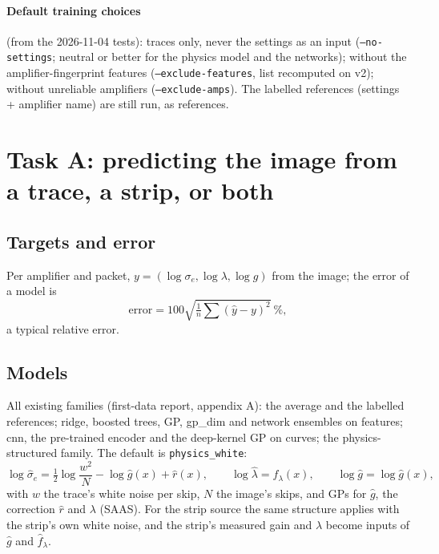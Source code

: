 \documentclass[11pt]{article}
\begin{document}
\paragraph{Default training choices} (from the 2026-11-04 tests): traces only, never the settings as an input
(\texttt{--no-settings}; neutral or better for the physics model and the networks); without the amplifier-fingerprint
features (\texttt{--exclude-features}, list recomputed on v2); without unreliable amplifiers
(\texttt{--exclude-amps}). The labelled references (settings + amplifier name) are still run, as references.

\section{Task A: predicting the image from a trace, a strip, or both}

\subsection{Targets and error}
Per amplifier and packet, $y=(\log\sigma_e,\log\lambda,\log g)$ from the image; the error of a model is
\[\mathrm{error}=100\sqrt{\tfrac1n\textstyle\sum(\hat y-y)^2}\ \%,\]
a typical relative error.

\subsection{Models}
All existing families (first-data report, appendix A): the average and the labelled references; ridge, boosted trees,
GP, gp\_dim and network ensembles on features; cnn, the pre-trained encoder and the deep-kernel GP on curves; the
physics-structured family. The default is \texttt{physics\_white}:
\begin{equation}
\log\hat\sigma_e=\tfrac12\log\frac{w^2}{N}-\log\hat g(x)+\hat r(x),\qquad \log\hat\lambda=\hat f_\lambda(x),\qquad \log\hat g=\log\hat g(x),
\end{equation}
with $w$ the trace's white noise per skip, $N$ the image's skips, and GPs for $\hat g$, the correction $\hat r$ and
$\lambda$ (SAAS). For the strip source the same structure applies with the strip's own white noise, and the strip's
measured gain and $\lambda$ become inputs of $\hat g$ and $\hat f_\lambda$.
\end{document}
